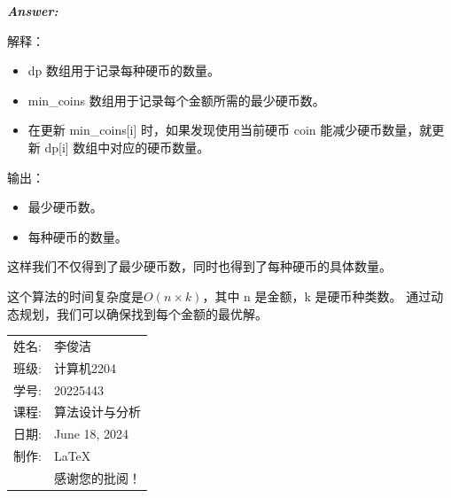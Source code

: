 \documentclass[12pt]{article}
\newenvironment{Answer}{
  \vspace{12pt}
  {\large\textbf{\textit{\hspace{-12pt}Answer:}}}\par
  \vspace{8pt}
} {\vspace{24pt}}
\begin{document}
\begin{Answer}
解释：

\begin{itemize}
  \item dp 数组用于记录每种硬币的数量。
  \item min\_coins 数组用于记录每个金额所需的最少硬币数。
  \item 在更新 min\_coins[i] 时，如果发现使用当前硬币 coin 能减少硬币数量，就更新 dp[i] 数组中对应的硬币数量。
\end{itemize}

输出：

\begin{itemize}
  \item 最少硬币数。
  \item 每种硬币的数量。
\end{itemize}

这样我们不仅得到了最少硬币数，同时也得到了每种硬币的具体数量。

这个算法的时间复杂度是$O(n×k)$，其中 n 是金额，k 是硬币种类数。
通过动态规划，我们可以确保找到每个金额的最优解。

\end{Answer}

\begin{flushright}\begin{tabular}{rl}
  姓名: & 李俊洁\\
  班级: & 计算机2204 \\
  学号: & 20225443 \\
  课程: & 算法设计与分析 \\
  日期: & June 18, 2024 \\
  制作: & \LaTeX \\
  & 感谢您的批阅！
\end{tabular}\end{flushright}
\end{document}

